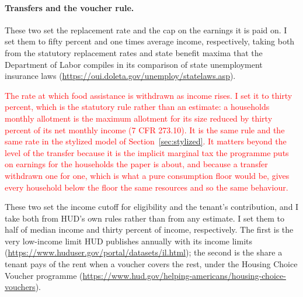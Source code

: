 \documentclass[10pt]{article}
\begin{document}
\paragraph{Transfers and the voucher rule.}
\begin{description}\setlength{\itemsep}{0.25em}\setlength{\parskip}{0em}
\item[$\psi$ and $\bar y$, unemployment insurance.] These two set the replacement
rate and the cap on the earnings it is paid on. I set them to fifty percent and one
times average income, respectively, taking both from the statutory replacement rates
and state benefit maxima that the Department of Labor compiles in its comparison of
state unemployment insurance laws
(\url{https://oui.doleta.gov/unemploy/statelaws.asp}).

\item[\textcolor{red}{$\varrho$, the food stamp clawback rate.}] \textcolor{red}{The rate at which food assistance is withdrawn as income rises. I set it to thirty percent, which is the statutory rule rather than an estimate: a household\textquotesingle s monthly allotment is the maximum allotment for its size reduced by thirty percent of its net monthly income (7 CFR 273.10). It is the same rule and the same rate in the stylized model of Section~\ref{sec:stylized}. It matters beyond the level of the transfer because it is the implicit marginal tax the programme puts on earnings for the households the paper is about, and because a transfer withdrawn one for one, which is what a pure consumption floor would be, gives every household below the floor the same resources and so the same behaviour.}

\item[$\kappa_V$ and $\kappa_r$, the voucher rules.] These two set the income
cutoff for eligibility and the tenant's contribution, and I take both from HUD's own
rules rather than from any estimate. I set them to half of median income and thirty
percent of income, respectively. The first is the very low-income limit HUD publishes
annually with its income limits
(\url{https://www.huduser.gov/portal/datasets/il.html}); the second is the share a
tenant pays of the rent when a voucher covers the rest, under the Housing Choice
Voucher programme
(\url{https://www.hud.gov/helping-americans/housing-choice-vouchers}).

\end{description}
\end{document}
